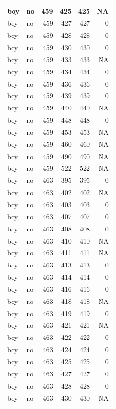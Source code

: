 \documentclass[man]{apa6}
\begin{document}
\begin{tabular}{l|l|r|r|r|r}
\hline
boy & no & 459 & 425 & 425 & NA\\
\hline
boy & no & 459 & 427 & 427 & 0\\
\hline
boy & no & 459 & 428 & 428 & 0\\
\hline
boy & no & 459 & 430 & 430 & 0\\
\hline
boy & no & 459 & 433 & 433 & NA\\
\hline
boy & no & 459 & 434 & 434 & 0\\
\hline
boy & no & 459 & 436 & 436 & 0\\
\hline
boy & no & 459 & 439 & 439 & 0\\
\hline
boy & no & 459 & 440 & 440 & NA\\
\hline
boy & no & 459 & 448 & 448 & 0\\
\hline
boy & no & 459 & 453 & 453 & NA\\
\hline
boy & no & 459 & 460 & 460 & NA\\
\hline
boy & no & 459 & 490 & 490 & NA\\
\hline
boy & no & 459 & 522 & 522 & NA\\
\hline
boy & no & 463 & 395 & 395 & 0\\
\hline
boy & no & 463 & 402 & 402 & NA\\
\hline
boy & no & 463 & 403 & 403 & 0\\
\hline
boy & no & 463 & 407 & 407 & 0\\
\hline
boy & no & 463 & 408 & 408 & 0\\
\hline
boy & no & 463 & 410 & 410 & NA\\
\hline
boy & no & 463 & 411 & 411 & NA\\
\hline
boy & no & 463 & 413 & 413 & 0\\
\hline
boy & no & 463 & 414 & 414 & 0\\
\hline
boy & no & 463 & 416 & 416 & 0\\
\hline
boy & no & 463 & 418 & 418 & NA\\
\hline
boy & no & 463 & 419 & 419 & 0\\
\hline
boy & no & 463 & 421 & 421 & NA\\
\hline
boy & no & 463 & 422 & 422 & 0\\
\hline
boy & no & 463 & 424 & 424 & 0\\
\hline
boy & no & 463 & 425 & 425 & 0\\
\hline
boy & no & 463 & 427 & 427 & 0\\
\hline
boy & no & 463 & 428 & 428 & 0\\
\hline
boy & no & 463 & 430 & 430 & NA\\

\end{tabular}
\end{document}
